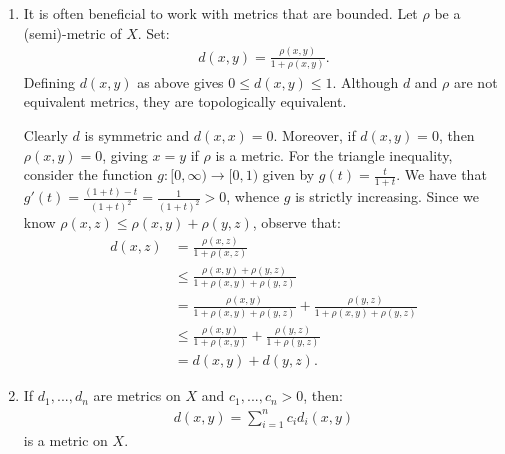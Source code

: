 \begin{example}
\begin{enumerate}[label = (\arabic*),itemsep=1pt,topsep=3pt]
            \item It is often beneficial to work with metrics that are bounded. Let $\rho$ be a (semi)-metric of $X$. Set:
                \begin{equation*}
                \begin{split}
                    d(x,y) = \frac{\rho(x,y)}{1 + \rho(x,y)}.
                \end{split}
                \end{equation*}
            Defining $d(x,y)$ as above gives $0 \leq d(x,y) \leq 1$. Although $d$ and $\rho$ are not equivalent metrics, they are topologically equivalent. 
            
            Clearly $d$ is symmetric and $d(x,x) = 0$. Moreover, if $d(x,y) = 0$, then $\rho(x,y) = 0$, giving $x=y$ if $\rho$ is a metric. For the triangle inequality, consider the function $g:[0,\infty) \rightarrow [0,1)$ given by $g(t) = \frac{t}{1+t}$. We have that $g'(t) = \frac{(1+t) - t}{(1+t)^2} = \frac{1}{(1+t)^2} > 0$, whence $g$ is strictly increasing. Since we know $\rho(x,z) \leq \rho(x,y) + \rho(y,z)$, observe that:
                \begin{equation*}
                \begin{split}
                    d(x,z)
                    & = \frac{\rho(x,z)}{1 + \rho(x,z)} \\
                    & \leq \frac{\rho(x,y) + \rho(y,z)}{1 + \rho(x,y) + \rho(y,z)} \\
                    & = \frac{\rho(x,y)}{1 + \rho(x,y) + \rho(y,z)} + \frac{\rho(y,z)}{1 + \rho(x,y) + \rho(y,z)} \\
                    & \leq \frac{\rho(x,y)}{1 + \rho(x,y)} + \frac{\rho(y,z)}{1  + \rho(y,z)} \\
                    & = d(x,y) + d(y,z).
                \end{split}
                \end{equation*}

            \item If $d_1,...,d_n$ are metrics on $X$ and $c_1,...,c_n > 0$, then:
                \begin{equation*}
                \begin{split}
                    d(x,y) = \sum_{i = 1}^n c_i d_i(x,y)
                \end{split}
                \end{equation*}
            is a metric on $X$.


\end{enumerate}
\end{example}
